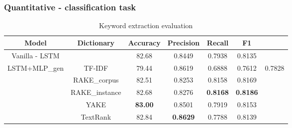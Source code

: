 \documentclass{beamer}
\begin{document}
\begin{frame}
\footnotesize
\frametitle{Quantitative - classification task}
    \begin{table}[]
        \centering
        \begin{tabular}{|c|c|c|c|c|c|c|}
        \hline
        Model& Dictionary&Accuracy& Precision & Recall & F1\\
        \hline
        Vanilla - LSTM& &82.68 & 0.8449 & 0.7938 & 0.8135
        \\\hline
        LSTM+MLP\_gen&TF-IDF& 79.44 & 0.8619 & 0.6888 & 0.7612 & 0.7828\\
        &RAKE\_corpus&82.51 & 0.8253 & 0.8158 & 0.8169 \\
        &RAKE\_instance&82.68 & 0.8276 & \textbf{0.8168} &\textbf{ 0.8186} \\
        &YAKE & \textbf{83.00 }& 0.8501 & 0.7919 & 0.8153\\
        & TextRank &82.84 & \textbf{0.8629} & 0.7788 & 0.8139\\
        \hline
        \end{tabular}
        \caption{Keyword extraction evaluation}
        \label{tab:ke_eval}
    \end{table}
\end{frame}
\end{document}
